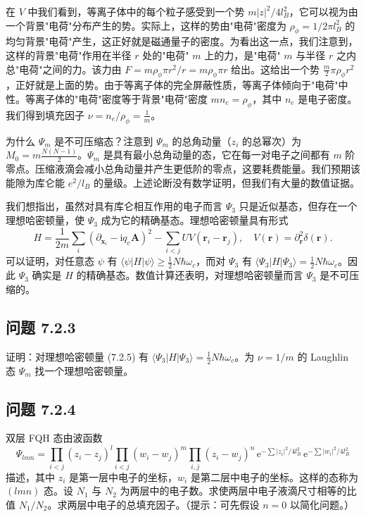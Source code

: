 在 $V$ 中我们看到，等离子体中的每个粒子感受到一个势 $m|z|^2/4l_B^2$，它可以视为由一个背景"电荷"分布产生的势。实际上，这样的势由"电荷"密度为 $\rho_\phi=1/2\pi l_B^2$ 的均匀背景"电荷"产生，这正好就是磁通量子的密度。为看出这一点，我们注意到，这样的背景"电荷"作用在半径 $r$ 处的"电荷" $m$ 上的力，是"电荷" $m$ 与半径 $r$ 之内总"电荷"之间的力。该力由 $F=m\rho_\phi\pi r^2/r=m\rho_\phi\pi r$ 给出。这给出一个势 $\frac{m}{2}\pi\rho_\phi r^2$，正好就是上面的势。由于等离子体的完全屏蔽性质，等离子体倾向于"电荷"中性。等离子体的"电荷"密度等于背景"电荷"密度 $mn_e=\rho_\phi$，其中 $n_e$ 是电子密度。我们得到填充因子 $\nu=n_e/\rho_\phi=\frac{1}{m}$。

为什么 $\Psi_m$ 是不可压缩态？注意到 $\Psi_m$ 的总角动量（$z_i$ 的总幂次）为 $M_0=m\frac{N(N-1)}{2}$。$\Psi_m$ 是具有最小总角动量的态，它在每一对电子之间都有 $m$ 阶零点。压缩液滴会减小总角动量并产生更低阶的零点，这要耗费能量。我们预期该能隙为库仑能 $e^2/l_B$ 的量级。上述论断没有数学证明，但我们有大量的数值证据。

我们想指出，虽然对具有库仑相互作用的电子而言 $\Psi_3$ 只是近似基态，但存在一个理想哈密顿量，使 $\Psi_3$ 成为它的精确基态。理想哈密顿量具有形式
\begin{equation*}
H=\frac{1}{2m}\sum_i(\partial_{\pmb{x}_i}-\mathrm{i}q_e\pmb{A})^2-\sum_{i<j}UV(\pmb{r}_i-\pmb{r}_j),\quad V(\pmb{r})=\partial_{\pmb{r}}^2\delta(\pmb{r}).
\tag{7.2.5}
\end{equation*}
可以证明，对任意态 $\psi$ 有 $\langle\psi|H|\psi\rangle\geqslant\frac{1}{2}N\hbar\omega_c$，而对 $\Psi_3$ 有 $\langle\Psi_3|H|\Psi_3\rangle=\frac{1}{2}N\hbar\omega_c$。因此 $\Psi_3$ 确实是 $H$ 的精确基态。数值计算还表明，对理想哈密顿量而言 $\Psi_3$ 是不可压缩的。

\subsection*{问题 7.2.3}

证明：对理想哈密顿量 (7.2.5) 有 $\langle\Psi_3|H|\Psi_3\rangle=\frac{1}{2}N\hbar\omega_c$。为 $\nu=1/m$ 的 Laughlin 态 $\Psi_m$ 找一个理想哈密顿量。

\subsection*{问题 7.2.4}

双层 FQH 态由波函数
\begin{equation*}
\Psi_{lmn}=\prod_{i<j}(z_i-z_j)^l\prod_{i<j}(w_i-w_j)^m\prod_{i,j}(z_i-w_j)^n\,\mathrm{e}^{-\sum|z_i|^2/4l_B^2}\,\mathrm{e}^{-\sum|w_i|^2/4l_B^2}
\tag{7.2.6}
\end{equation*}
描述，其中 $z_i$ 是第一层中电子的坐标，$w_i$ 是第二层中电子的坐标。这样的态称为 $(lmn)$ 态。设 $N_1$ 与 $N_2$ 为两层中的电子数。求使两层中电子液滴尺寸相等的比值 $N_1/N_2$。求两层中电子的总填充因子。（提示：可先假设 $n=0$ 以简化问题。）


